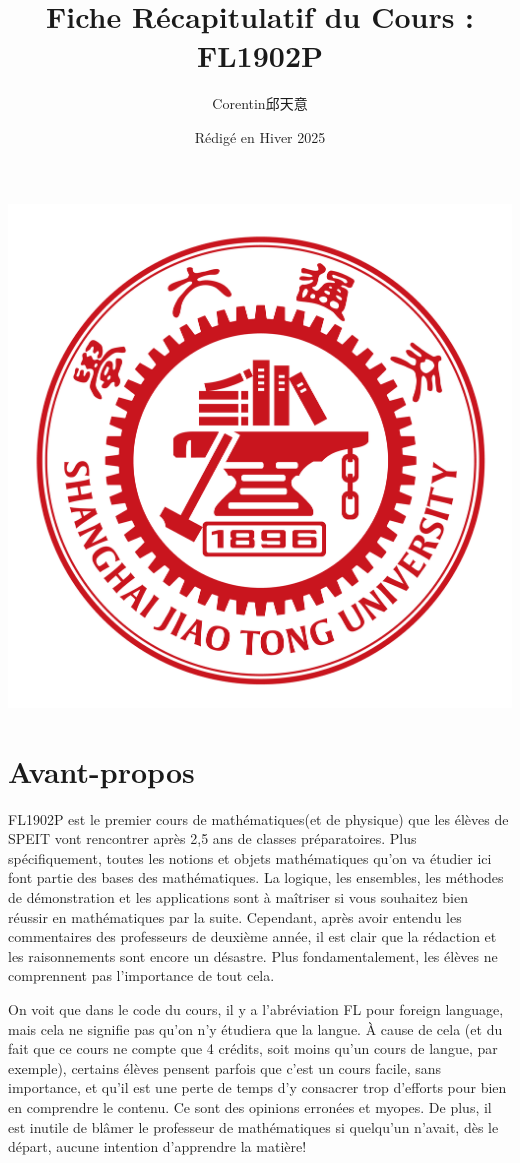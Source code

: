 \documentclass{article}
\title{\textbf{Fiche Récapitulatif du Cours :\\ FL1902P}}
\author{Corentin邱天意}
\date{Rédigé en Hiver 2025}
\begin{document}
\maketitle

\centerline{\includegraphics[scale=0.4]{sjtu}}

\newpage

\section*{Avant-propos}

FL1902P est le premier cours de mathématiques(et de physique) que les élèves de SPEIT vont rencontrer après 2,5 ans de classes préparatoires. Plus spécifiquement, toutes les notions et objets mathématiques qu'on va étudier ici font partie des bases des mathématiques. La logique, les ensembles, les méthodes de démonstration et les applications sont à maîtriser si vous souhaitez bien réussir en mathématiques par la suite. Cependant, après avoir entendu les commentaires des professeurs de deuxième année, il est clair que la rédaction et les raisonnements sont encore un désastre. Plus fondamentalement, les élèves ne comprennent pas l'importance de tout cela.

On voit que dans le code du cours, il y a l'abréviation FL pour foreign language, mais cela ne signifie pas qu'on n'y étudiera que la langue. À cause de cela (et du fait que ce cours ne compte que 4 crédits, soit moins qu'un cours de langue, par exemple), certains élèves pensent parfois que c'est un cours facile, sans importance, et qu'il est une perte de temps d'y consacrer trop d'efforts pour bien en comprendre le contenu. Ce sont des opinions erronées et myopes. De plus, il est inutile de blâmer le professeur de mathématiques si quelqu'un n'avait, dès le départ, aucune intention d'apprendre la matière!
\end{document}
